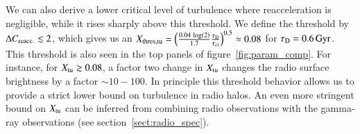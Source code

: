 \documentclass[fleqn,usenatbib,useAMS]{mnras}
\begin{document}
We can also derive a lower critical level of turbulence where
reacceleration is negligible, while it rises sharply above this
threshold. We define the threshold by $\Delta C_{\mathrm{reacc.}}  \lesssim
2$, which gives us an $X_{\mathrm{thres,tu}} = \left(\frac{0.04\,\log(2)
}{1.7}\frac{\tau_{\mathrm{D}}}{\tau_{\mathrm{cl}}}\right)^{0.5} \approx 0.08$
for $\tau_{\mathrm{D}} = 0.6\,{\mathrm{Gyr}}$. This threshold is also seen in
the top panels of figure~\ref{fig:param_comp}. For instance, for
$X_{\mathrm{tu}}\gtrsim0.08$, a factor two change in $X_{\mathrm{tu}}$ changes
the radio surface brightness by a factor $\sim 10-100$. In principle
this threshold behavior allows us to provide a strict lower bound on
turbulence in radio halos. An even more stringent bound on
$X_{\mathrm{tu}}$ can be inferred from combining radio observations with
the gamma-ray observations (see section~\ref{sect:radio_spec}).
\end{document}
